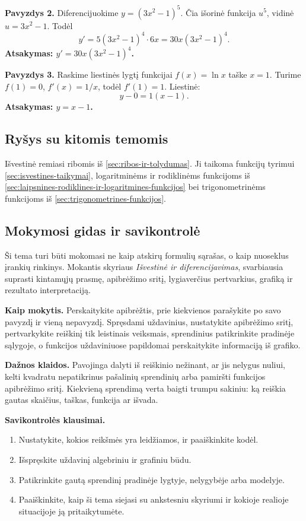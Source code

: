 \textbf{Pavyzdys 2.} Diferencijuokime $y=(3x^2-1)^5$. Čia išorinė funkcija $u^5$, vidinė $u=3x^2-1$. Todėl
\[
y'=5(3x^2-1)^4\cdot6x=30x(3x^2-1)^4.
\]
\textbf{Atsakymas: $y'=30x(3x^2-1)^4$.}

\textbf{Pavyzdys 3.} Raskime liestinės lygtį funkcijai $f(x)=\ln x$ taške $x=1$. Turime $f(1)=0$, $f'(x)=1/x$, todėl $f'(1)=1$. Liestinė:
\[
y-0=1(x-1).
\]
\textbf{Atsakymas: $y=x-1$.}

\subsection{Ryšys su kitomis temomis}

Išvestinė remiasi ribomis iš \ref{sec:ribos-ir-tolydumas}. Ji taikoma funkcijų tyrimui \ref{sec:isvestines-taikymai}, logaritminėms ir rodiklinėms funkcijoms iš \ref{sec:laipsnines-rodiklines-ir-logaritmines-funkcijos} bei trigonometrinėms funkcijoms iš \ref{sec:trigonometrines-funkcijos}.

\subsection{Mokymosi gidas ir savikontrolė}

Ši tema turi būti mokomasi ne kaip atskirų formulių sąrašas, o kaip nuoseklus įrankių rinkinys. Mokantis skyriaus \textit{Išvestinė ir diferencijavimas}, svarbiausia suprasti kintamųjų prasmę, apibrėžimo sritį, lygiaverčius pertvarkius, grafiką ir rezultato interpretaciją.

\textbf{Kaip mokytis.} Perskaitykite apibrėžtis, prie kiekvienos parašykite po savo pavyzdį ir vieną nepavyzdį. Spręsdami uždavinius, nustatykite apibrėžimo sritį, pertvarkykite reiškinį tik leistinais veiksmais, sprendinius patikrinkite pradinėje sąlygoje, o funkcijos uždaviniuose papildomai perskaitykite informaciją iš grafiko.

\textbf{Dažnos klaidos.} Pavojinga dalyti iš reiškinio nežinant, ar jis nelygus nuliui, kelti kvadratu nepatikrinus pašalinių sprendinių arba pamiršti funkcijos apibrėžimo sritį. Kiekvieną sprendimą verta baigti trumpu sakiniu: ką reiškia gautas skaičius, taškas, funkcija ar išvada.

\textbf{Savikontrolės klausimai.}
\begin{enumerate}[label=\arabic*.]
\item Nustatykite, kokios reikšmės yra leidžiamos, ir paaiškinkite kodėl.
\item Išspręskite uždavinį algebriniu ir grafiniu būdu.
\item Patikrinkite gautą sprendinį pradinėje lygtyje, nelygybėje arba modelyje.
\item Paaiškinkite, kaip ši tema siejasi su ankstesniu skyriumi ir kokioje realioje situacijoje ją pritaikytumėte.
\end{enumerate}

